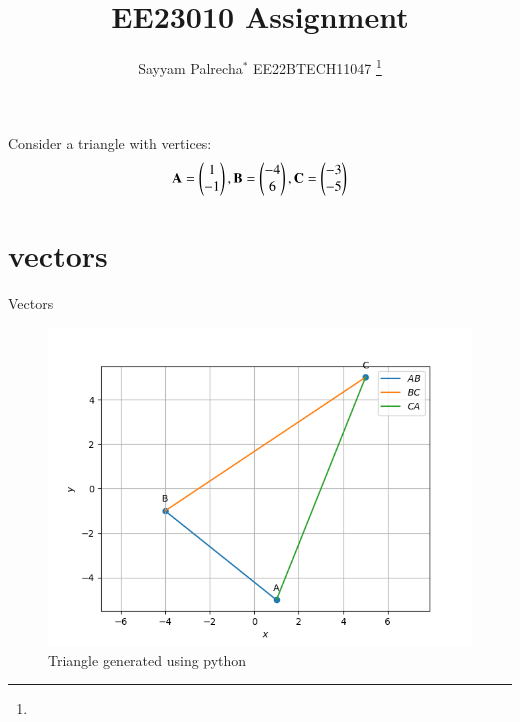 \documentclass[journal,12pt,onecolumn]{IEEEtran}
\theoremstyle{remark}
\begin{document}


\vspace{3cm}
\title{
EE23010 Assignment
}
\author{ Sayyam Palrecha$^{*}$ EE22BTECH11047%
	\thanks{}	
}

\maketitle
\bigskip
\renewcommand{\thefigure}{\theenumi}
\renewcommand{\thetable}{\theenumi}

Consider a triangle with vertices:
\begin{align}
\mathbf{A} = \begin{pmatrix}1\\-1\end{pmatrix},
\mathbf{B} = \begin{pmatrix}-4\\6\end{pmatrix},
\mathbf{C} = \begin{pmatrix}-3\\-5\end{pmatrix}
\end{align}
\begin{table}[!ht]
	\section{vectors}
	\centering
	
	\caption{Vectors}
	\label{table:vectors}
\end{table}

\begin{figure}
\includegraphics[width=\columnwidth]{./figs/Q1.1.3.png}
\caption{Triangle generated using python}
\label{fig:vectors}
\end{figure}
\end{document}
